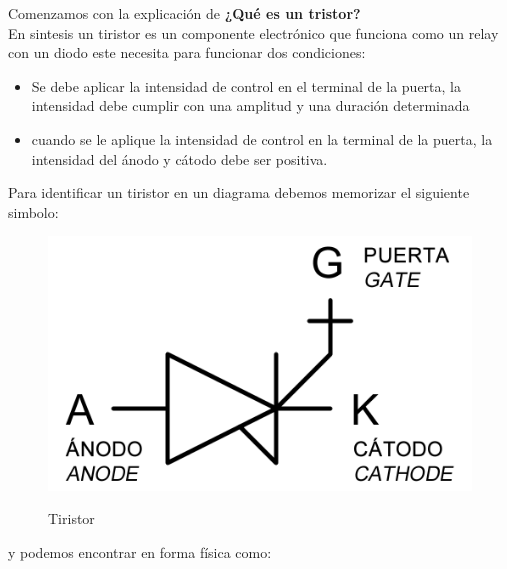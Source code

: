 \documentclass[letterpaper]{article}
\begin{document}
\begin{Large}


\newpage
Comenzamos con la explicación de \textbf{¿Qué es un tristor?}\\
\vspace{.5cm}
En sintesis un tiristor es un componente electrónico que funciona como un relay con un diodo este necesita para funcionar dos condiciones: 
	\begin{itemize}
	 \item Se debe aplicar la intensidad de control en el terminal de la puerta, la intensidad debe cumplir con una amplitud y una duración determinada 
	 \item cuando se le aplique la intensidad de control en la terminal de la puerta, la intensidad del ánodo y cátodo debe ser positiva.
	\end{itemize}
Para identificar un tiristor en un diagrama debemos memorizar el siguiente simbolo: \\

\begin{figure}[hbtp]
\centering
\includegraphics[scale=.2]{Imagenes/TiristorTC.png}\\
\caption{Tiristor}
\end{figure}

y podemos encontrar en forma física como: 


\end{Large}
\end{document}
